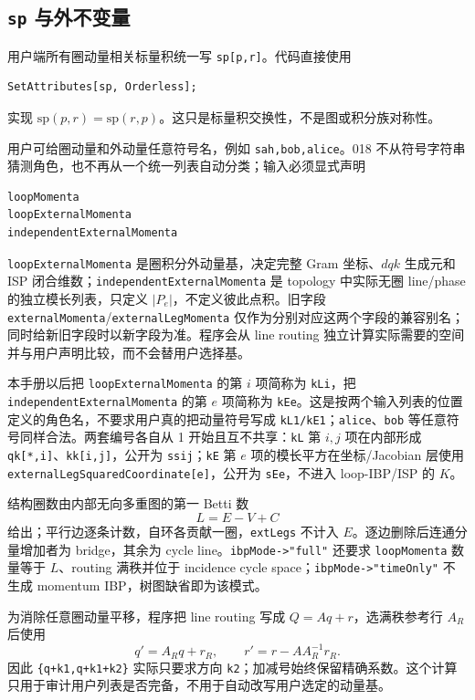﻿\documentclass[a4paper,11pt]{article}
\begin{document}
\subsection{\texttt{sp} 与外不变量}

用户端所有圈动量相关标量积统一写 \texttt{sp[p,r]}。代码直接使用
\begin{verbatim}
SetAttributes[sp, Orderless];
\end{verbatim}
实现 $\mathrm{sp}(p,r)=\mathrm{sp}(r,p)$。这只是标量积交换性，不是图或积分族对称性。

用户可给圈动量和外动量任意符号名，例如 \texttt{sah,bob,alice}。018 不从符号字符串猜测角色，也不再从一个统一列表自动分类；输入必须显式声明
\begin{verbatim}
loopMomenta
loopExternalMomenta
independentExternalMomenta
\end{verbatim}
\texttt{loopExternal\allowbreak Momenta} 是圈积分外动量基，决定完整 Gram 坐标、$dqk$ 生成元和 ISP 闭合维数；\texttt{independentExternal\allowbreak Momenta} 是 topology 中实际无圈 line/phase 的独立模长列表，只定义 $|P_e|$，不定义彼此点积。旧字段 \texttt{externalMomenta}/\texttt{externalLegMomenta} 仅作为分别对应这两个字段的兼容别名；同时给新旧字段时以新字段为准。程序会从 line routing 独立计算实际需要的空间并与用户声明比较，而不会替用户选择基。

本手册以后把 \texttt{loopExternalMomenta} 的第 $i$ 项简称为 \texttt{kLi}，把 \texttt{independentExternalMomenta} 的第 $e$ 项简称为 \texttt{kEe}。这是按两个输入列表的位置定义的角色名，不要求用户真的把动量符号写成 \texttt{kL1/kE1}；\texttt{alice}、\texttt{bob} 等任意符号同样合法。两套编号各自从 1 开始且互不共享：\texttt{kL} 第 $i,j$ 项在内部形成 \texttt{qk[*,i]}、\texttt{kk[i,j]}，公开为 \texttt{ssij}；\texttt{kE} 第 $e$ 项的模长平方在坐标/Jacobian 层使用 \texttt{externalLegSquaredCoordinate[e]}，公开为 \texttt{sEe}，不进入 loop-IBP/ISP 的 $K$。

结构圈数由内部无向多重图的第一 Betti 数
\begin{equation}
 L=E-V+C
\end{equation}
给出；平行边逐条计数，自环各贡献一圈，\texttt{extLegs} 不计入 $E$。逐边删除后连通分量增加者为 bridge，其余为 cycle line。\texttt{ibpMode->"full"} 还要求 \texttt{loopMomenta} 数量等于 $L$、routing 满秩并位于 incidence cycle space；\texttt{ibpMode->"timeOnly"} 不生成 momentum IBP，树图缺省即为该模式。

为消除任意圈动量平移，程序把 line routing 写成 $Q=Aq+r$，选满秩参考行 $A_R$ 后使用
\begin{equation}
 q'=A_Rq+r_R,\qquad r'=r-AA_R^{-1}r_R.
\end{equation}
因此 \texttt{\{q+k1,q+k1+k2\}} 实际只要求方向 \texttt{k2}；加减号始终保留精确系数。这个计算只用于审计用户列表是否完备，不用于自动改写用户选定的动量基。
\end{document}
